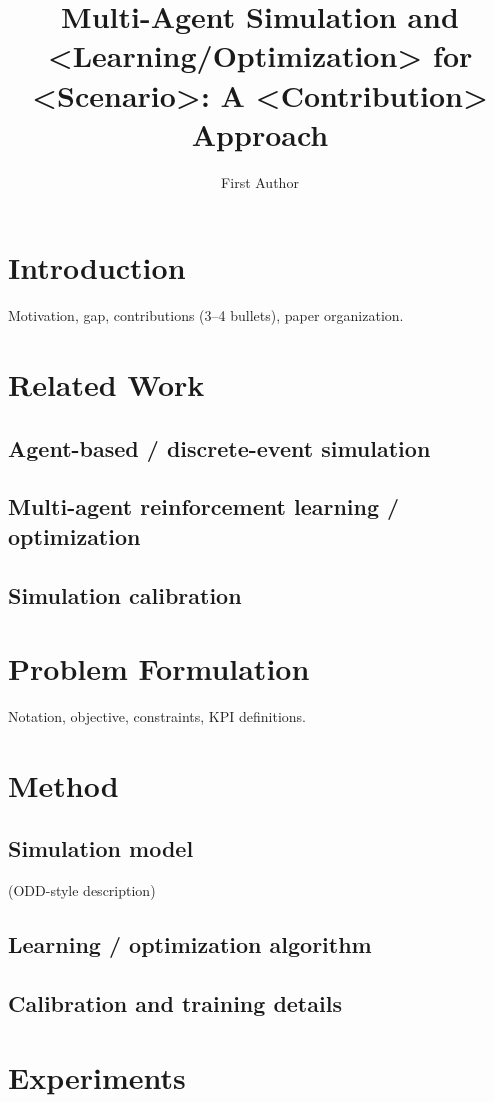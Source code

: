 \documentclass[review]{elsarticle} %
\title{Multi-Agent Simulation and <Learning/Optimization> for <Scenario>: A <Contribution> Approach}
\author[1]{First Author\corref{cor1}}
\begin{document}
\maketitle

\section{Introduction}\label{sec:intro}
    Motivation, gap, contributions (3--4 bullets), paper organization.

\section{Related Work}\label{sec:related}
    \subsection{Agent-based / discrete-event simulation}
    \subsection{Multi-agent reinforcement learning / optimization}
    \subsection{Simulation calibration}

\section{Problem Formulation}\label{sec:problem}
    Notation, objective, constraints, KPI definitions.

\section{Method}\label{sec:method}
    \subsection{Simulation model} (ODD-style description)
    \subsection{Learning / optimization algorithm}
    \subsection{Calibration and training details}

\section{Experiments}\label{sec:exp}
\end{document}
